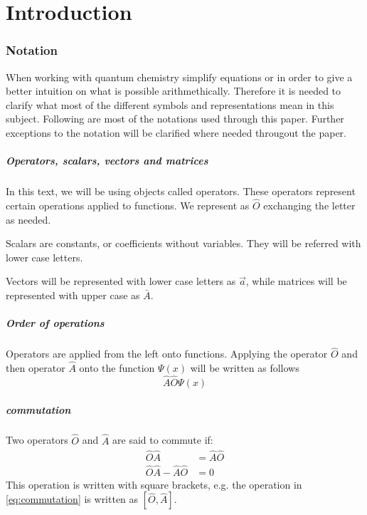 \documentclass[../master_thesis.tex]{subfiles}
\begin{document}
\chapter{Introduction}
\subsection{Notation}
When working with quantum chemistry simplify equations or in order to give a
better intuition on what is possible arithmethically. Therefore it is needed to
clarify what most of the different symbols and representations mean in this
subject. Following are most of the notations used through this paper. Further exceptions to the notation will be
clarified where needed througout the paper.
\paragraph{Operators, scalars, vectors and matrices}
In this text, we will be using objects called operators. These operators represent
certain operations applied to functions. We represent as $\hat{O}$ exchanging the letter
as needed.

Scalars are constants, or coefficients without variables. They will be referred with
lower case letters.

Vectors will be represented with lower case letters as $\vec{a}$, while
matrices will be represented with upper case as $\bar{A}$.
\paragraph{Order of operations}
Operators are applied from the left onto functions. Applying the operator
$\hat{O}$ and then operator $\hat{A}$ onto the function $\Psi(x)$ will be written as follows
\begin{equation}
  \hat{A}\hat{O}\Psi(x)
\end{equation}

\paragraph{commutation}
Two operators $\hat{O}$ and $\hat{A}$ are said to commute if:
\begin{align}
  \hat{O}\hat{A} &= \hat{A}\hat{O} \\
  \hat{O}\hat{A} - \hat{A}\hat{O} &= 0\label{eq:commutation}
\end{align}
This operation is written with square brackets, e.g. the operation in \ref{eq:commutation} is
written as $[\hat{O},\hat{A}]$.
\end{document}

